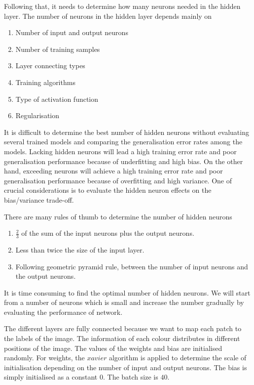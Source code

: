 Following that, it needs to determine how many neurons needed in the hidden layer. The number of neurons in the hidden layer depends mainly on
\begin{enumerate}
  \item Number of input and output neurons
  \item Number of training samples
  \item Layer connecting types
  \item Training algorithms
  \item Type of activation function
  \item Regularisation
\end{enumerate}
It is difficult to determine the best number of hidden neurons without evaluating several trained models and comparing the generalisation error rates among the models. Lacking hidden neurons will lead a high training error rate and poor generalisation performance because of underfitting and high bias. On the other hand, exceeding neurons will achieve a high training error rate and poor generalisation performance because of overfitting and high variance. One of crucial considerations is to evaluate the hidden neuron effects on the bias/variance trade-off.

There are many rules of thumb to determine the number of hidden neurons \citep{heaton2008introduction}
\begin{enumerate}
  \item $\frac{2}{3}$ of the sum of the input neurons plus the output neurons.
  \item Less than twice the size of the input layer.
  \item Following geometric pyramid rule, between the number of input neurons and the output neurons.
\end{enumerate}
It is time consuming to find the optimal number of hidden neurons. We will start from a number of neurons which is small and increase the number gradually by evaluating the performance of network.

The different layers are fully connected because we want to map each patch to the labels of the image. The information of each colour distributes in different positions of the image. The values of the weights and bias are initialised randomly. For weights, the $xavier$ algorithm is applied to determine the scale of initialisation depending on the number of input and output neurons. The bias is simply initialised as a constant $0$. The batch size is $40$.

